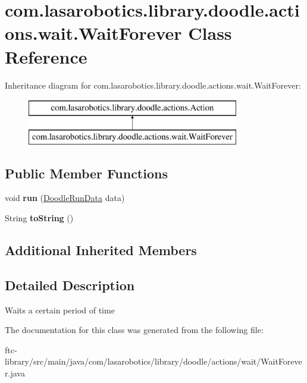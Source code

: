 \hypertarget{classcom_1_1lasarobotics_1_1library_1_1doodle_1_1actions_1_1wait_1_1_wait_forever}{}\section{com.\+lasarobotics.\+library.\+doodle.\+actions.\+wait.\+Wait\+Forever Class Reference}
\label{classcom_1_1lasarobotics_1_1library_1_1doodle_1_1actions_1_1wait_1_1_wait_forever}
Inheritance diagram for com.\+lasarobotics.\+library.\+doodle.\+actions.\+wait.\+Wait\+Forever\+:\begin{figure}[H]
\begin{center}
\leavevmode
\includegraphics[height=2.000000cm]{classcom_1_1lasarobotics_1_1library_1_1doodle_1_1actions_1_1wait_1_1_wait_forever}
\end{center}
\end{figure}
\subsection*{Public Member Functions}
\begin{DoxyCompactItemize}
\item 
\hypertarget{classcom_1_1lasarobotics_1_1library_1_1doodle_1_1actions_1_1wait_1_1_wait_forever_a3bc44df6aeb098931a3034e8bdc0bee8}{}void {\bfseries run} (\hyperlink{classcom_1_1lasarobotics_1_1library_1_1doodle_1_1_doodle_run_data}{Doodle\+Run\+Data} data)\label{classcom_1_1lasarobotics_1_1library_1_1doodle_1_1actions_1_1wait_1_1_wait_forever_a3bc44df6aeb098931a3034e8bdc0bee8}

\item 
\hypertarget{classcom_1_1lasarobotics_1_1library_1_1doodle_1_1actions_1_1wait_1_1_wait_forever_acafd79d95cf4267b1948cb029b70f9a3}{}String {\bfseries to\+String} ()\label{classcom_1_1lasarobotics_1_1library_1_1doodle_1_1actions_1_1wait_1_1_wait_forever_acafd79d95cf4267b1948cb029b70f9a3}

\end{DoxyCompactItemize}
\subsection*{Additional Inherited Members}


\subsection{Detailed Description}
Waits a certain period of time 

The documentation for this class was generated from the following file\+:\begin{DoxyCompactItemize}
\item 
ftc-\/library/src/main/java/com/lasarobotics/library/doodle/actions/wait/Wait\+Forever.\+java\end{DoxyCompactItemize}
